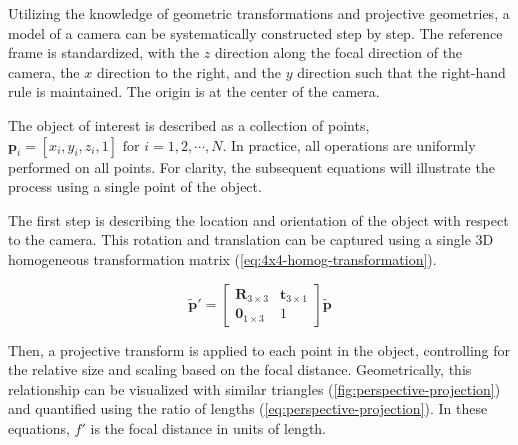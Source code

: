 Utilizing the knowledge of geometric transformations and projective geometries, a model of a camera can be systematically constructed step by step.
The reference frame is standardized, with the $z$ direction along the focal direction of the camera, the $x$ direction to the right, and the $y$ direction such that the right-hand rule is maintained.
The origin is at the center of the camera.

The object of interest is described as a collection of points, $\mathbf{p}_i =  [x_i, y_i, z_i, 1] \text{ for } i = 1,2,\cdots,N$.
In practice, all operations are uniformly performed on all points.
For clarity, the subsequent equations will illustrate the process using a single point of the object.

The first step is describing the location and orientation of the object with respect to the camera.
This rotation and translation can be captured using a single 3D homogeneous transformation matrix (\cref{eq:4x4-homog-transformation}).

\begin{equation}
    \tilde{\mathbf{p}}' = \begin{bmatrix}
        \mathbf{R}_{3 \times 3} & \mathbf{t}_{3 \times 1} \\ \mathbf{0}_{1 \times 3} & 1
    \end{bmatrix} \tilde{\mathbf{p}}
    \label{eq:4x4-homog-transformation}
\end{equation}

Then, a projective transform is applied to each point in the object, controlling for the relative size and scaling based on the focal distance.
Geometrically, this relationship can be visualized with similar triangles (\cref{fig:perspective-projection}) and quantified using the ratio of lengths (\cref{eq:perspective-projection}).
In these equations, $f'$ is the focal distance in units of length.

